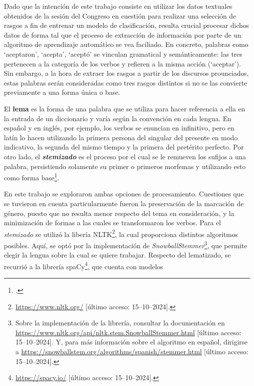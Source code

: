 Dado que la intenci\'on de este trabajo consiste en utilizar los datos textuales
obtenidos de la sesi\'on del Congreso en cuesti\'on para realizar una selecci\'on
de rasgos a fin de entrenar un modelo de clasificaci\'on, resulta crucial procesar dichos
datos de forma tal que el proceso de extracci\'on de informaci\'on por parte
de un algoritmo de aprendizaje autom\'atico se vea faciliado. En concreto, palabras
como `aceptaron', `acepta', `acept\'o' se vinculan gramatical y sem\'anticamente:
las tres pertenecen a la categor\'ia de los verbos y refieren a la misma acci\'on (`aceptar').
Sin embargo, a la hora de extraer los rasgos a partir de los discursos prounciados,
estas palabras ser\'an consideradas como tres rasgos distintos si no se las convierte
previamente a una forma \'unica o base.
\par
El \textbf{lema} es la forma de una palabra que se utiliza para hacer referencia a ella
en la entrada de un diccionario y var\'ia seg\'un la convenci\'on en cada lengua. En español
y en ingl\'es, por ejemplo, los verbos se enuncian en infinitivo, pero en lat\'in lo hacen
utilizando la primera persona del singular del presente en modo indicativo, la segunda
del mismo tiempo y la primera del pret\'erito perfecto. Por otro lado, el
\textbf{\textit{stemizado}} es el proceso por el cual se le remueven los sufijos
a una palabra, persistiendo solamente su primer o primeros morfemas y utilizando
esto como forma base\footnote{\citet[Cap\'itulo~3]{bird2009natural}.}.
\par
En este trabajo se exploraron ambas opciones de procesamiento. Cuestiones que se tuvieron
en cuenta particularmente fueron la preservaci\'on de la marcaci\'on de g\'enero, puesto que
no resulta menor respecto del tema en consideraci\'on, y la minimizaci\'on de formas a las
cuales se transformaron los verbos. Para el \textit{stemizado} se utiliz\'o la
liber\'ia NLTK\footnote{\url{https://www.nltk.org/} [\'ultimo acceso: 15--10--2024].},
la cual proporciona distintos algoritmos posibles. Aqu\'i, se opt\'o por la
implementaci\'on de \textit{SnowballStemmer}\footnote{Sobre la implementaci\'on de la
librer\'ia, consultar la documentaci\'on en
\url{https://www.nltk.org/api/nltk.stem.SnowballStemmer.html}
[\'ultimo acceso: 15--10--2024]. Y, para m\'as informaci\'on
sobre el algoritmo en español, dirigirse a
\url{https://snowballstem.org/algorithms/spanish/stemmer.html}
[\'ultimo acceso: 15--10--2024].}, que permite elegir
la lengua sobre la cual se quiere trabajar. Respecto del lematizado, se recurri\'o
a la librer\'ia spaCy\footnote{\url{https://spacy.io/}
[\'ultimo acceso: 15--10--2024].}, que cuenta con modelos
